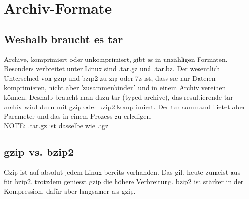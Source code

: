 \section{Archiv-Formate}
\subsection{Weshalb braucht es tar}
Archive, komprimiert oder unkomprimiert, gibt es in unz\"ahligen Formaten. Besonders verbreitet unter Linux sind .tar.gz und .tar.bz. Der wesentlich Unterschied von gzip und bzip2 zu zip oder 7z ist, dass sie nur Dateien komprimieren, nicht aber 'zusammenbinden' und in einem Archiv vereinen k\"onnen. Deshalb braucht man dazu tar (typed archive), das resultierende tar archiv wird dann mit gzip oder bzip2 komprimiert. Der tar command bietet aber Parameter und das in einem Prozess zu erledigen.\\
NOTE: .tar.gz ist dasselbe wie .tgz
\subsection{gzip vs. bzip2}
Gzip ist auf absolut jedem Linux bereits vorhanden. Das gilt heute zumeist aus f\"ur bzip2, trotzdem geniesst gzip die h\"ohere Verbreitung. bzip2 ist st\"arker in der Kompression, daf\"ur aber langsamer als gzip.
